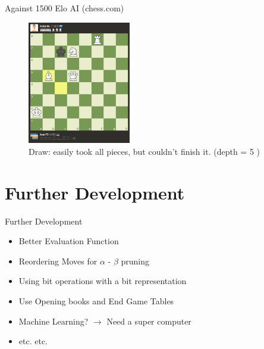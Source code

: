 \documentclass{beamer}
\begin{document}
\begin{frame}{Against 1500 Elo AI (chess.com)}
    \begin{figure}
        \centering
        \includegraphics[width=0.4\textwidth]{play1500.png} %
        \caption{Draw: easily took all pieces, but couldn't finish it. (depth = 5 )}

    \end{figure}
\end{frame}

%

\section{Further Development}

\begin{frame}{Further Development}
  \begin{itemize}
    \item Better Evaluation Function
    \item Reordering Moves for $\alpha$ - $\beta$ pruning
    \item Using bit operations with a bit representation
    \item Use Opening books and End Game Tables
    \item Machine Learning? $\rightarrow$ Need a super computer
    \item etc. etc.
  \end{itemize}
\end{frame}
\end{document}
